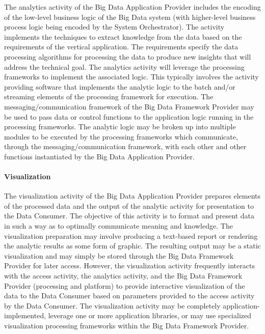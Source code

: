 \documentclass[10pt]{article}
\begin{document}
The analytics activity of the Big Data Application Provider includes
the encoding of the low-level business logic of the Big Data system
(with higher-level business process logic being encoded by the System
Orchestrator). The activity implements the techniques to extract
knowledge from the data based on the requirements of the vertical
application. The requirements specify the data processing algorithms
for processing the data to produce new insights that will address the
technical goal. The analytics activity will leverage the processing
frameworks to implement the associated logic. This typically involves
the activity providing software that implements the analytic logic to
the batch and/or streaming elements of the processing framework for
execution. The messaging/communication framework of the Big Data
Framework Provider may be used to pass data or control functions to
the application logic running in the processing frameworks. The
analytic logic may be broken up into multiple modules to be executed
by the processing frameworks which communicate, through the
messaging/communication framework, with each other and other functions
instantiated by the Big Data Application Provider.

\paragraph{Visualization}

The visualization activity of the Big Data Application Provider
prepares elements of the processed data and the output of the analytic
activity for presentation to the Data Consumer. The objective of this
activity is to format and present data in such a way as to optimally
communicate meaning and knowledge. The visualization preparation may
involve producing a text-based report or rendering the analytic
results as some form of graphic. The resulting output may be a static
visualization and may simply be stored through the Big Data Framework
Provider for later access. However, the visualization activity
frequently interacts with the access activity, the analytics activity,
and the Big Data Framework Provider (processing and platform) to
provide interactive visualization of the data to the Data Consumer
based on parameters provided to the access activity by the Data
Consumer. The visualization activity may be completely
application-implemented, leverage one or more application libraries,
or may use specialized visualization processing frameworks within the
Big Data Framework Provider.
\end{document}
